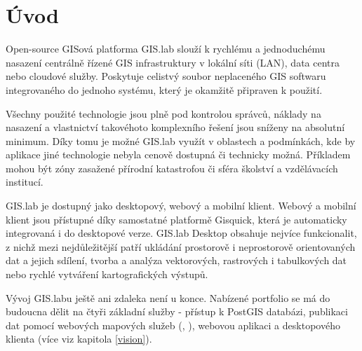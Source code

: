 \chapter{Úvod}
\label{1-uvod}


Open-source GISová platforma GIS.lab slouží k rychlému a jednoduchému
nasazení centrálně řízené GIS infrastruktury v lokální síti (LAN),
data centra nebo cloudové služby. Poskytuje celistvý soubor
neplaceného GIS softwaru integrovaného do jednoho systému, který je
okamžitě připraven k použití.

Všechny použité technologie jsou plně pod kontrolou správců, náklady
na nasazení a vlastnictví takovéhoto komplexního řešení jsou sníženy
na absolutní minimum. Díky tomu je možné GIS.lab využít v oblastech a
podmínkách, kde by aplikace jiné technologie nebyla cenově dostupná či
technicky možná. Příkladem mohou být zóny zasažené přírodní
katastrofou či sféra školství a vzdělávacích institucí.


GIS.lab je dostupný jako desktopový, webový a mobilní klient. Webový a
mobilní klient jsou přístupné díky samostatné platformě Gisquick,
která je automaticky integrovaná i do desktopové verze. GIS.lab
Desktop obsahuje nejvíce funkcionalit, z nichž mezi nejdůležitější
patří ukládání prostorově i neprostorově orientovaných dat a jejich
sdílení, tvorba a analýza vektorových, rastrových i tabulkových dat
nebo rychlé vytváření kartografických výstupů.

Vývoj GIS.labu ještě ani zdaleka není u konce. Nabízené portfolio se
má do budoucna dělit na čtyři základní služby - přístup k PostGIS
databázi, publikaci dat pomocí webových mapových služeb (,
), webovou aplikaci a desktopového klienta (více viz kapitola
\ref{vision}).


